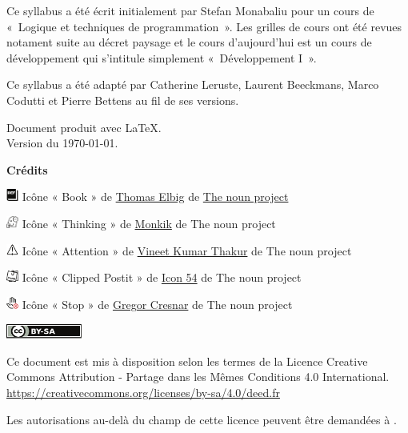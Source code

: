 
\thispagestyle{empty}

Ce syllabus a été écrit initialement par Stefan Monabaliu pour un cours de
«~Logique et techniques de programmation~». Les grilles de cours ont été revues
notament suite au décret paysage et le cours d'aujourd'hui est un cours de
développement qui s'intitule simplement «~Développement I~».

Ce syllabus a été adapté par Catherine Leruste, Laurent Beeckmans, Marco
Codutti et Pierre Bettens au fil de ses versions. 

\bigskip
\noindent
Document produit avec \LaTeX.
\\Version du \today.

\vfill

\textbf{Crédits}

\includegraphics[width=4mm]{icon/definition}
Icône « Book » de 
\href{https://thenounproject.com/dergraph}{Thomas Elbig} de 
\href{https://thenounproject.com}{The noun project}

\includegraphics[width=4mm]{icon/reflexion}
Icône « Thinking » de 
\href{https://thenounproject.com/kukkik_jung/}{Monkik} de 
The noun project

\includegraphics[width=4mm]{icon/attention}
Icône « Attention » de 
\href{https://thenounproject.com/vkvineet}{Vineet Kumar Thakur} de
The noun project

\includegraphics[width=4mm]{icon/fiche}
Icône « Clipped Postit » de 
\href{https://thenounproject.com/icon54app/}{Icon 54} de
The noun project

\includegraphics[width=4mm]{icon/dont}
Icône « Stop » de 
\href{https://thenounproject.com/grega.cresnar}{Gregor Cresnar} de
The noun project




\vspace{1cm}
\includegraphics[width=25mm]{images/cc-by-sa}

Ce document est mis à disposition selon les termes de la Licence Creative
\\Commons Attribution - Partage dans les Mêmes Conditions 4.0 International.
\\\url{https://creativecommons.org/licenses/by-sa/4.0/deed.fr}

Les autorisations au-delà du champ de cette licence
peuvent être demandées à \texttt{\contact}.

